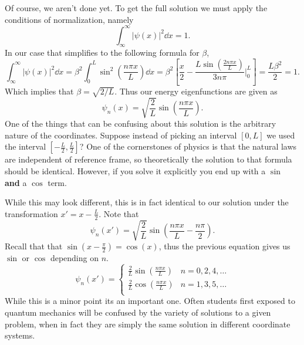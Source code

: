 \documentclass[10pt]{article}
\begin{document}
Of course, we aren't done yet. To get the full solution we must apply the conditions of normalization, namely 
\[
  \int_{\infty}^\infty |\psi(x)|^2 \dd{x} = 1.
\]
In our case that simplifies to the following formula for $\beta$,
\[
  \int_{\infty}^\infty |\psi(x)|^2 \dd{x} 
  = \beta^2 \int_{0}^L \sin^2(\frac{n\pi x}{L}) \dd{x} 
  = \beta^2 \left [ \frac{x}{2} - \frac{L\sin(\frac{2n\pi x}{L})}{3n\pi} \Bigg|_0^L \right]
  = \frac{L\beta^2}{2} = 1.
\]
Which implies that $\beta = \sqrt{2/L}$. Thus our energy eigenfunctions are given as 
\[
  \psi_n(x) = \sqrt{\frac{2}{L}}\sin(\frac{n\pi x}{L}).
\]
One of the things that can be confusing about this solution is the arbitrary nature of the coordinates. Suppose instead of picking an interval $[0, L]$ we used the interval $[-\frac{L}{2}, \frac{L}{2}]$? One of the cornerstones of physics is that the natural laws are independent of reference frame, so theoretically the solution to that formula should be identical. However, if you solve it explicitly you end up with a $\sin$ \textbf{and} a $\cos$ term. 

While this may look different, this is in fact identical to our solution under the transformation $x' = x - \frac{L}{2}$. Note that 
\[
  \psi_n(x') = \sqrt{\frac{2}{L}} \sin(\frac{n \pi x}{L} - \frac{n \pi}{2}).
\] 
Recall that that $\sin(x - \frac{\pi}{2}) = \cos(x)$, thus the previous equation gives us $\sin$ or $\cos$ depending on $n$.
\[
  \psi_n(x') = \begin{cases}
    \frac{2}{L} \sin(\frac{n\pi x}{L}) & n = 0, 2, 4, \dots \\
    \frac{2}{L} \cos(\frac{n\pi x}{L}) & n = 1, 3, 5, \dots \\
  \end{cases}
\] 
While this is a minor point its an important one. Often students first exposed to quantum mechanics will be confused by the variety of solutions to a given problem, when in fact they are simply the same solution in different coordinate systems.
\end{document}
